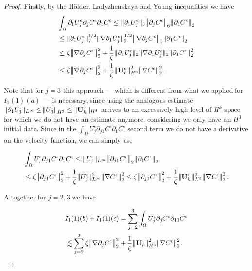 \documentclass[12pt]{report}
\numberwithin{theorem}{chapter}
\numberwithin{corollary}{chapter}
\numberwithin{lemma}{chapter}
\numberwithin{remark}{chapter}
\numberwithin{definition}{chapter}
\numberwithin{prop}{chapter}
\begin{document}
\begin{proof}
Firstly, by the H\"older, Ladyzhenskaya and Young inequalities we have
\begin{equation}
  \begin{split}
    & \int_\Omega \partial_1 U_j^\epsilon \partial_j C^\epsilon \partial_1 C^\epsilon \leq \| \partial_1 U_j^\epsilon \| _3 \norm{\partial_j C^\epsilon}_6 \norm{\partial_1 C^\epsilon}_2 \\
    & \leq \| \partial_1 U_j^\epsilon \|_2^{1/2} \|\nabla \partial_1 U_j^\epsilon \|_2^{1/2} \norm{\nabla \partial_j C^\epsilon}_2 \norm{\partial_1 C^\epsilon}_2 \\
    & \leq \zeta \norm{\nabla \partial_j C^\epsilon}_2^2 + \frac{1}{\zeta} \| \partial_1 U_j^\epsilon \|_2 \|\nabla \partial_1 U_j^\epsilon \|_2 \norm{\partial_1 C^\epsilon}_2^2 \\
    & \leq \zeta \norm{\nabla \partial_j C^\epsilon}_2^2 + \frac{1}{\zeta} \norm{\mathbf{U}_h^\epsilon}_{H^3}^2 \norm{\nabla C^\epsilon}_2^2.
  \end{split}
\end{equation}

Note that for $j=3$ this approach --- which is different from what we applied for $I_1(1)(a)$ --- is necessary, since using the analogous estimate $\| \partial_1 U_3^\epsilon \| _ {L^\infty} \leq \norm{U_3^\epsilon}_{H^3} \leq \| \mathbf{U}_h^\epsilon \| _{H^4}$ arrives to an excessively high level of $H^k$ space for which we do not have an estimate anymore, considering we only have an $H^3$ initial data. Since in the $\int_\Omega U_j^\epsilon \partial_{j1} C^\epsilon \partial_1 C^\epsilon$ second term we do not have a derivative on the velocity function, we can simply use

\begin{equation} \nonumber
  \begin{split}
    & \int_\Omega U_j^\epsilon \partial_{j1} C^\epsilon \partial_1 C^\epsilon \leq \| U_j^\epsilon \| _{L^\infty} \norm{\partial_{j1} C^\epsilon}_2 \norm{\partial_1 C^\epsilon}_2 \\
    &  \leq \zeta \norm{\partial_{j1} C^\epsilon}_2^2 +  \frac{1}{\zeta} \| U_j^\epsilon \| _{L^\infty}^2 \norm{\nabla C^\epsilon}_2^2 \leq \zeta \norm{\partial_{j1} C^\epsilon}_2^2 +  \frac{1}{\zeta} \| \mathbf{U}_h^\epsilon \| _{H^3}^2 \norm{\nabla C^\epsilon}_2^2. 
  \end{split}
\end{equation}

Altogether for $j = 2,3$ we have

\begin{equation}
  \begin{split}
    & I_1(1)(b) + I_1(1)(c) = \sum_{j=2}^3 \int_\Omega U_j^\epsilon \partial_j C^\epsilon \partial_{11} C^\epsilon \\
    & \lesssim \sum_{j=2}^3 \zeta \norm{\nabla \partial_j C^\epsilon}_2^2 + \frac{1}{\zeta} \norm{\mathbf{U}_h}_{H^3}^2 \norm{\nabla C^\epsilon}_2^2.
  \end{split}
\end{equation}


\end{proof}
\end{document}

